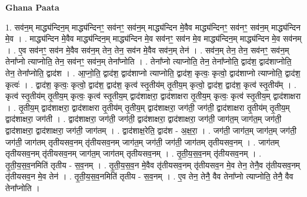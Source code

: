 \documentclass[17pt]{extarticle}
\begin{document}
\textbf{Ghana Paata } \newline

1. सव॑न॒म् माद्ध्य॑न्दिन॒म् माद्ध्य॑न्दिनꣳ॒॒ सव॑नꣳ॒॒ सव॑न॒म् माद्ध्य॑न्दिन मे॒वैव माद्ध्य॑न्दिनꣳ॒॒ सव॑नꣳ॒॒ सव॑न॒म् माद्ध्य॑न्दिन मे॒व । . माद्ध्य॑न्दिन मे॒वैव माद्ध्य॑न्दिन॒म् माद्ध्य॑न्दिन मे॒व सव॑नꣳ॒॒ सव॑न मे॒व माद्ध्य॑न्दिन॒म् माद्ध्य॑न्दिन मे॒व सव॑नम् । . ए॒व सव॑नꣳ॒॒ सव॑न मे॒वैव सव॑न॒म् तेन॒ तेन॒ सव॑न मे॒वैव सव॑न॒म् तेन॑ । . सव॑न॒म् तेन॒ तेन॒ सव॑नꣳ॒॒ सव॑न॒म् तेना᳚प्नो त्याप्नोति॒ तेन॒ सव॑नꣳ॒॒ सव॑न॒म् तेना᳚प्नोति । . तेना᳚प्नो त्याप्नोति॒ तेन॒ तेना᳚प्नोति॒ द्वाद॑श॒ द्वाद॑शाप्नोति॒ तेन॒ तेना᳚प्नोति॒ द्वाद॑श । . आ॒प्नो॒ति॒ द्वाद॑श॒ द्वाद॑शाप्नो त्याप्नोति॒ द्वाद॑श॒ कृत्वः॒ कृत्वो॒ द्वाद॑शाप्नो त्याप्नोति॒ द्वाद॑श॒ कृत्वः॑ । . द्वाद॑श॒ कृत्वः॒ कृत्वो॒ द्वाद॑श॒ द्वाद॑श॒ कृत्व॑ स्तृ॒तीय॑म् तृ॒तीय॒म् कृत्वो॒ द्वाद॑श॒ द्वाद॑श॒ कृत्व॑ स्तृ॒तीय᳚म् । . कृत्व॑ स्तृ॒तीय॑म् तृ॒तीय॒म् कृत्वः॒ कृत्व॑ स्तृ॒तीय॒म् द्वाद॑शाक्षरा॒ द्वाद॑शाक्षरा तृ॒तीय॒म् कृत्वः॒ कृत्व॑ स्तृ॒तीय॒म् द्वाद॑शाक्षरा । . तृ॒तीय॒म् द्वाद॑शाक्षरा॒ द्वाद॑शाक्षरा तृ॒तीय॑म् तृ॒तीय॒म् द्वाद॑शाक्षरा॒ जग॑ती॒ जग॑ती॒ द्वाद॑शाक्षरा तृ॒तीय॑म् तृ॒तीय॒म् द्वाद॑शाक्षरा॒ जग॑ती । . द्वाद॑शाक्षरा॒ जग॑ती॒ जग॑ती॒ द्वाद॑शाक्षरा॒ द्वाद॑शाक्षरा॒ जग॑ती॒ जाग॑त॒म् जाग॑त॒म् जग॑ती॒ द्वाद॑शाक्षरा॒ द्वाद॑शाक्षरा॒ जग॑ती॒ जाग॑तम् । . द्वाद॑शाक्ष॒रेति॒ द्वाद॑श - अ॒क्ष॒रा॒ । . जग॑ती॒ जाग॑त॒म् जाग॑त॒म् जग॑ती॒ जग॑ती॒ जाग॑तम् तृतीयसव॒नम् तृ॑तीयसव॒नम् जाग॑त॒म् जग॑ती॒ जग॑ती॒ जाग॑तम् तृतीयसव॒नम् । . जाग॑तम् तृतीयसव॒नम् तृ॑तीयसव॒नम् जाग॑त॒म् जाग॑तम् तृतीयसव॒नम् । . तृ॒ती॒य॒स॒व॒नम् तृ॑तीयसव॒नम् । . तृ॒ती॒य॒स॒व॒नमिति॑ तृतीय - स॒व॒नम् । . तृ॒ती॒य॒स॒व॒न मे॒वैव तृ॑तीयसव॒नम् तृ॑तीयसव॒न मे॒व तेन॒ तेनै॒व तृ॑तीयसव॒नम् तृ॑तीयसव॒न मे॒व तेन॑ । . तृ॒ती॒य॒स॒व॒नमिति॑ तृतीय - स॒व॒नम् । . ए॒व तेन॒ तेनै॒ वैव तेना᳚प्नो त्याप्नोति॒ तेनै॒ वैव तेना᳚प्नोति । \newline
\end{document}
